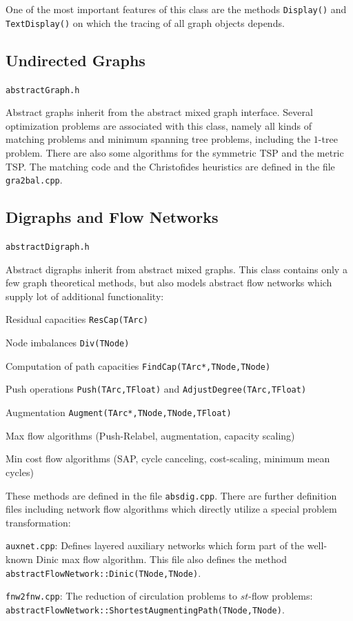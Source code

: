 \documentclass[a4paper,11pt,twoside]{book}
\begin{document}
\begin{multicols}{2}
One of the most important features of this class are the methods
\verb/Display()/ and \verb/TextDisplay()/ on which the tracing of all
graph objects depends.


\subsection{Undirected Graphs}
\myinclude\verb/abstractGraph.h/

\bigskip\noindent
Abstract graphs inherit from the abstract mixed graph interface. Several
optimization problems are associated with this class, namely all kinds of
matching problems and minimum spanning tree problems, including the
$1$-tree problem. There are also some algorithms for the symmetric TSP and the
metric TSP. The matching code and the Christofides heuristics are defined
in the file \verb/gra2bal.cpp/.


\subsection{Digraphs and Flow Networks}
\myinclude\verb/abstractDigraph.h/

\bigskip\noindent
Abstract digraphs inherit from abstract mixed graphs. This class contains only a
few graph theoretical methods, but also models abstract flow networks which
supply lot of additional functionality:
\begin{myitemize}
\item Residual capacities \verb/ResCap(TArc)/
\item Node imbalances \verb/Div(TNode)/
\item Computation of path capacities \verb/FindCap(TArc*,TNode,TNode)/
\item Push operations \verb/Push(TArc,TFloat)/ and
    \verb/AdjustDegree(TArc,TFloat)/
\item Augmentation \verb/Augment(TArc*,TNode,TNode,TFloat)/
\item Max flow algorithms (Push-Relabel, augmentation, capacity scaling)
\item Min cost flow algorithms (SAP, cycle canceling, cost-scaling, minimum
    mean cycles)
\end{myitemize}
These methods are defined in the file \verb/absdig.cpp/. There are further
definition files including network flow algorithms which directly utilize a
special problem transformation:
\begin{myitemize}
\item \verb/auxnet.cpp/: Defines layered auxiliary networks which form part of
the well-known Dinic max flow algorithm. This file also defines the method
\verb/abstractFlowNetwork::Dinic(TNode,TNode)/.
\item \verb/fnw2fnw.cpp/: The reduction of circulation problems
to $st$-flow problems: \verb/abstractFlowNetwork::ShortestAugmentingPath(TNode,TNode)/.
\end{myitemize}



\end{multicols}
\end{document}
